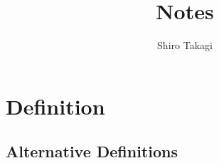 \documentclass{article}
\title{Notes}
\author{Shiro Takagi}
\begin{document}
\sloppy
\maketitle
\tableofcontents




\appendix

\section{Definition}

\subsection{Alternative Definitions}




\end{document}

